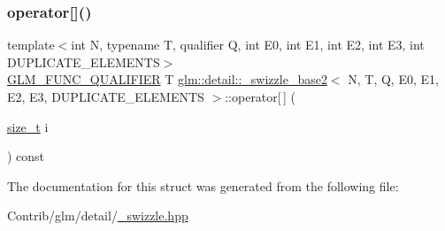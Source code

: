 \mbox{\label{structglm_1_1detail_1_1__swizzle__base2_a0e341ddb30329eabeac3361833e45cd0}} 
\subsubsection{\texorpdfstring{operator[]()}{operator[]()}\hspace{0.1cm}{\footnotesize\ttfamily [2/2]}}
{\footnotesize\ttfamily template$<$int N, typename T, qualifier Q, int E0, int E1, int E2, int E3, int D\+U\+P\+L\+I\+C\+A\+T\+E\+\_\+\+E\+L\+E\+M\+E\+N\+TS$>$ \\
\mbox{\hyperlink{setup_8hpp_a33fdea6f91c5f834105f7415e2a64407}{G\+L\+M\+\_\+\+F\+U\+N\+C\+\_\+\+Q\+U\+A\+L\+I\+F\+I\+ER}} T \mbox{\hyperlink{structglm_1_1detail_1_1__swizzle__base2}{glm\+::detail\+::\+\_\+swizzle\+\_\+base2}}$<$ N, T, Q, E0, E1, E2, E3, D\+U\+P\+L\+I\+C\+A\+T\+E\+\_\+\+E\+L\+E\+M\+E\+N\+TS $>$\+::operator\mbox{[}$\,$\mbox{]} (\begin{DoxyParamCaption}\item[{\mbox{\hyperlink{_s_d_l__config__winrt_8h_a7c94ea6f8948649f8d181ae55911eeaf}{size\+\_\+t}}}]{i }\end{DoxyParamCaption}) const\hspace{0.3cm}{\ttfamily [inline]}}



The documentation for this struct was generated from the following file\+:\begin{DoxyCompactItemize}
\item 
Contrib/glm/detail/\mbox{\hyperlink{__swizzle_8hpp}{\+\_\+swizzle.\+hpp}}\end{DoxyCompactItemize}
